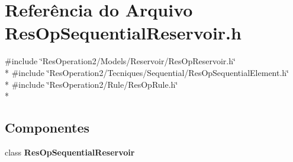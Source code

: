 \section{Referência do Arquivo Res\+Op\+Sequential\+Reservoir.\+h}
\label{_res_op_sequential_reservoir_8h}
{\ttfamily \#include \char`\"{}Res\+Operation2/\+Models/\+Reservoir/\+Res\+Op\+Reservoir.\+h\char`\"{}}\\*
{\ttfamily \#include \char`\"{}Res\+Operation2/\+Tecniques/\+Sequential/\+Res\+Op\+Sequential\+Element.\+h\char`\"{}}\\*
{\ttfamily \#include \char`\"{}Res\+Operation2/\+Rule/\+Res\+Op\+Rule.\+h\char`\"{}}\\*
\subsection*{Componentes}
\begin{DoxyCompactItemize}
\item 
class {\bf Res\+Op\+Sequential\+Reservoir}
\end{DoxyCompactItemize}
